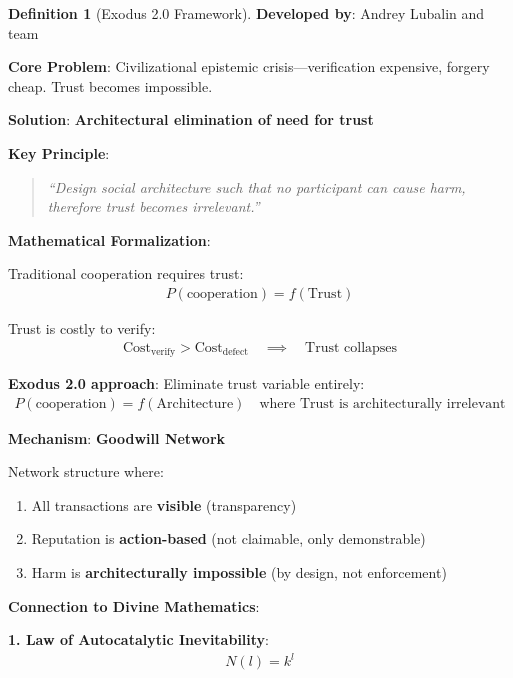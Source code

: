 \documentclass[11pt,a4paper]{article}
\theoremstyle{definition}
\newtheorem{definition}{Definition}[section]
\theoremstyle{remark}
\begin{document}
\begin{enumerate}
\begin{definition}[Exodus 2.0 Framework]
\textbf{Developed by}: Andrey Lubalin and team \cite{LubalinZeraoulia2025Deterministic, LubalinZeraoulia2025Chaos, LubalinZeraoulia2025Law, Lubalin2025DiscoveryLaw, Lubalin2024ExodusInnovation, Lubalin2024ExodusLaw, Lubalin2024BeyondTrust, Lubalin2024FromCentralized, Lubalin2024Impossible, Lubalin2024BeyondAISafety}

\textbf{Core Problem}: Civilizational epistemic crisis—verification expensive, forgery cheap. Trust becomes impossible.

\textbf{Solution}: \textbf{Architectural elimination of need for trust}

\textbf{Key Principle}:
\begin{quote}
\textit{``Design social architecture such that no participant can cause harm, therefore trust becomes irrelevant.''}
\end{quote}

\textbf{Mathematical Formalization}:

Traditional cooperation requires trust:
\begin{align}
P(\text{cooperation}) = f(\text{Trust})
\end{align}

Trust is costly to verify:
\begin{align}
\text{Cost}_{\text{verify}} > \text{Cost}_{\text{defect}} \quad \implies \quad \text{Trust collapses}
\end{align}

\textbf{Exodus 2.0 approach}: Eliminate trust variable entirely:
\begin{align}
P(\text{cooperation}) = f(\text{Architecture}) \quad \text{where Trust is architecturally irrelevant}
\end{align}

\textbf{Mechanism}: \textbf{Goodwill Network}

Network structure where:
\begin{enumerate}
    \item All transactions are \textbf{visible} (transparency)
    \item Reputation is \textbf{action-based} (not claimable, only demonstrable)
    \item Harm is \textbf{architecturally impossible} (by design, not enforcement)
\end{enumerate}

\textbf{Connection to Divine Mathematics}:

\textbf{1. Law of Autocatalytic Inevitability}:
\begin{align}
N(l) = k^l
\end{align}


\end{definition}
\end{enumerate}
\end{document}
